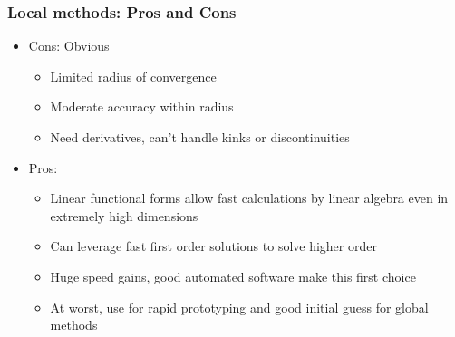 \documentclass[bigger]{beamer}
\begin{document}
\begin{frame}%

\frametitle{Local methods: Pros and Cons}

\begin{itemize}

\item Cons: Obvious
\begin{itemize}
\item Limited radius of convergence 
\item Moderate accuracy within radius 
\item Need derivatives, can't handle kinks or discontinuities
\end{itemize}

\item Pros:
\begin{itemize}
\item Linear functional forms allow fast calculations by linear algebra even in extremely high dimensions
\item Can leverage fast first order solutions to solve higher order
\item Huge speed gains, good automated software make this first choice
\item At worst, use for rapid prototyping and good initial guess for global methods
\end{itemize}

\end{itemize}

\end{frame}%
\end{document}
